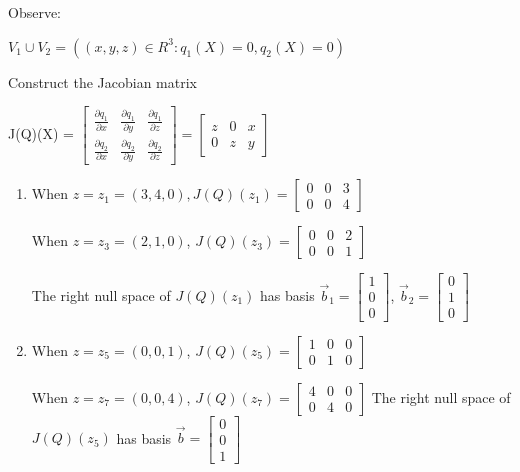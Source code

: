 \documentclass[11pt]{article}
\begin{document}
Observe:

\(V_1 \cup V_2 = ((x,y,z) \in R^3: q_1(X) = 0, q_2(X) = 0)\)

Construct the Jacobian matrix

J(Q)(X) = \(\begin{bmatrix} \frac{\partial q_1}{\partial x} & \frac{\partial q_1}{\partial y} & \frac{\partial q_1}{\partial z}\\ \frac{\partial q_2}{\partial x} & \frac{\partial q_2}{\partial y} & \frac{\partial q_2}{\partial z}\end{bmatrix} = \begin{bmatrix} z & 0 & x\\ 0 & z & y \end{bmatrix}\)

\begin{enumerate}
\item When \(z = z_1 = (3, 4, 0), J(Q)(z_1) = \begin{bmatrix} 0 & 0 & 3\\ 0 & 0 & 4 \end{bmatrix}\)

When \(z = z_3 = (2, 1, 0)\), \(J(Q)(z_3) = \begin{bmatrix} 0 & 0 & 2\\ 0 & 0 & 1 \end{bmatrix}\)

The right null space of \(J(Q)(z_1)\) has basis \(\vec b_1 = \begin{bmatrix} 1\\ 0\\ 0 \end{bmatrix}\), \(\vec b_2 = \begin{bmatrix} 0\\ 1\\ 0 \end{bmatrix}\)

\item When \(z = z_5 = (0,0,1)\), \(J(Q)(z_5) = \begin{bmatrix} 1 & 0 & 0\\ 0 & 1 & 0
   \end{bmatrix}\)

When \(z = z_7 = (0, 0, 4)\), \(J(Q)(z_7) = \begin{bmatrix} 4 & 0 & 0\\ 0 & 4 & 0 \end{bmatrix}\)
The right null space of \(J(Q)(z_5)\) has basis \(\vec b = \begin{bmatrix} 0\\ 0\\ 1 \end{bmatrix}\)
\end{enumerate}
\end{document}
